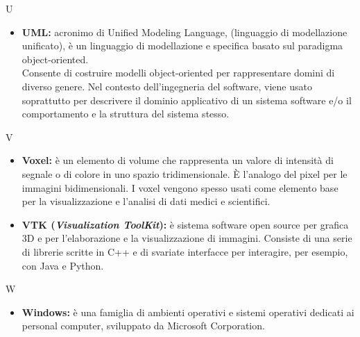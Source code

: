 \Huge U
\normalsize
\begin{itemize}
\item \textbf{UML:} acronimo di Unified Modeling Language, (linguaggio di modellazione unificato), è un linguaggio di modellazione e specifica basato sul paradigma object-oriented.
\\Consente di costruire modelli object-oriented per rappresentare domini di diverso genere. Nel contesto dell'ingegneria del software, viene usato soprattutto per descrivere il dominio applicativo di un sistema software e/o il comportamento e la struttura del sistema stesso.
\end{itemize}
\pagebreak

\Huge V
\normalsize
\begin{itemize}
\item\textbf{Voxel:} è un elemento di volume che rappresenta un valore di intensità di segnale o di colore in uno spazio tridimensionale. È l'analogo del pixel\glossario{} per le immagini bidimensionali. I voxel vengono spesso usati come elemento base per la visualizzazione e l'analisi di dati medici e scientifici.

\item\textbf{VTK (\textit{Visualization ToolKit}):} è sistema software open source per grafica 3D e per l'elaborazione e la visualizzazione di immagini. Consiste di una serie di librerie scritte in C++\glossario{} e di svariate interfacce per interagire, per esempio, con Java e Python.
\end{itemize}
\pagebreak

\Huge W
\normalsize
\begin{itemize}
\item\textbf{Windows:} è una famiglia di ambienti operativi e sistemi operativi dedicati ai personal computer, sviluppato da Microsoft Corporation.
\end{itemize}
\pagebreak






